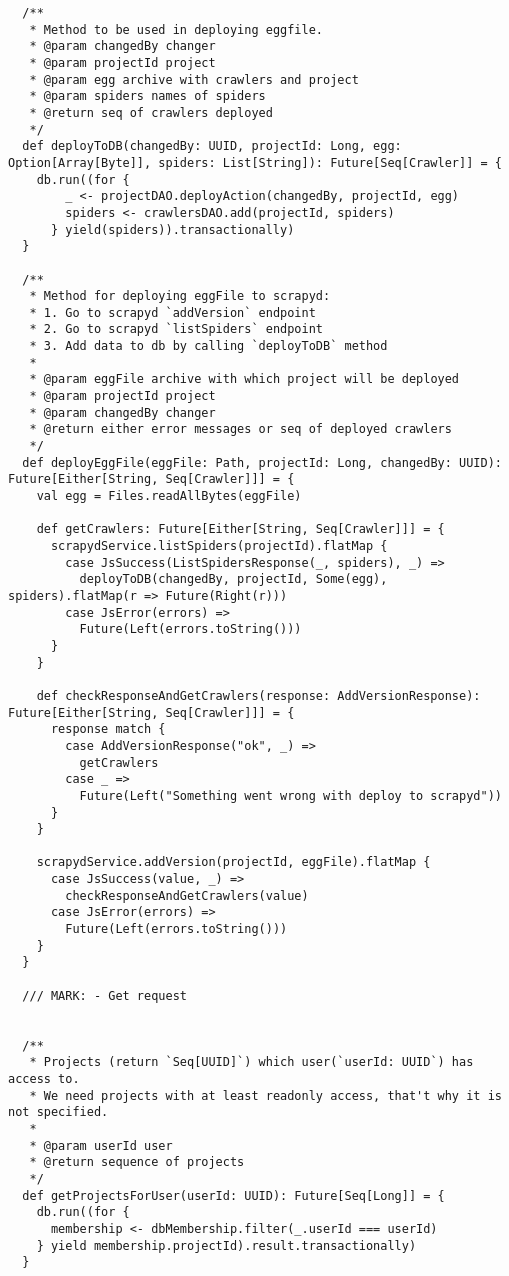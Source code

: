 \begin{lstlisting}
  /**
   * Method to be used in deploying eggfile.
   * @param changedBy changer
   * @param projectId project
   * @param egg archive with crawlers and project
   * @param spiders names of spiders
   * @return seq of crawlers deployed
   */
  def deployToDB(changedBy: UUID, projectId: Long, egg: Option[Array[Byte]], spiders: List[String]): Future[Seq[Crawler]] = {
    db.run((for {
        _ <- projectDAO.deployAction(changedBy, projectId, egg)
        spiders <- crawlersDAO.add(projectId, spiders)
      } yield(spiders)).transactionally)
  }

  /**
   * Method for deploying eggFile to scrapyd:
   * 1. Go to scrapyd `addVersion` endpoint
   * 2. Go to scrapyd `listSpiders` endpoint
   * 3. Add data to db by calling `deployToDB` method
   *
   * @param eggFile archive with which project will be deployed
   * @param projectId project
   * @param changedBy changer
   * @return either error messages or seq of deployed crawlers
   */
  def deployEggFile(eggFile: Path, projectId: Long, changedBy: UUID): Future[Either[String, Seq[Crawler]]] = {
    val egg = Files.readAllBytes(eggFile)

    def getCrawlers: Future[Either[String, Seq[Crawler]]] = {
      scrapydService.listSpiders(projectId).flatMap {
        case JsSuccess(ListSpidersResponse(_, spiders), _) =>
          deployToDB(changedBy, projectId, Some(egg), spiders).flatMap(r => Future(Right(r)))
        case JsError(errors) =>
          Future(Left(errors.toString()))
      }
    }

    def checkResponseAndGetCrawlers(response: AddVersionResponse): Future[Either[String, Seq[Crawler]]] = {
      response match {
        case AddVersionResponse("ok", _) =>
          getCrawlers
        case _ =>
          Future(Left("Something went wrong with deploy to scrapyd"))
      }
    }

    scrapydService.addVersion(projectId, eggFile).flatMap {
      case JsSuccess(value, _) =>
        checkResponseAndGetCrawlers(value)
      case JsError(errors) =>
        Future(Left(errors.toString()))
    }
  }

  /// MARK: - Get request


  /**
   * Projects (return `Seq[UUID]`) which user(`userId: UUID`) has access to.
   * We need projects with at least readonly access, that't why it is not specified.
   *
   * @param userId user
   * @return sequence of projects
   */
  def getProjectsForUser(userId: UUID): Future[Seq[Long]] = {
    db.run((for {
      membership <- dbMembership.filter(_.userId === userId)
    } yield membership.projectId).result.transactionally)
  }


\end{lstlisting}
